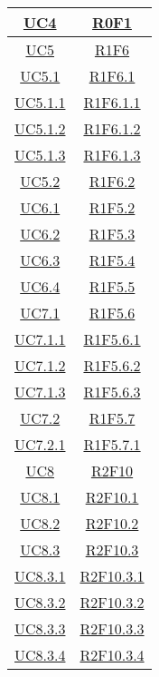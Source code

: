 \begin{longtable}{|c|c|}
	\hyperlink{UC4}{UC4} & \hyperlink{R0F1}{R0F1}\\
	\hline
	\hyperlink{UC5}{UC5} & \hyperlink{R1F6}{R1F6}\\
	\hline
	\hyperlink{UC5.1}{UC5.1} & \hyperlink{R1F6.1}{R1F6.1}\\
	\hline
	\hyperlink{UC5.1.1}{UC5.1.1} & \hyperlink{R1F6.1.1}{R1F6.1.1}\\
	\hline
	\hyperlink{UC5.1.2}{UC5.1.2} & \hyperlink{R1F6.1.2}{R1F6.1.2}\\
	\hline
	\hyperlink{UC5.1.3}{UC5.1.3} & \hyperlink{R1F6.1.3}{R1F6.1.3}\\
	\hline
	\hyperlink{UC5.2}{UC5.2} & \hyperlink{R1F6.2}{R1F6.2}\\
	\hline
	\hyperlink{UC6.1}{UC6.1} & \hyperlink{R1F5.2}{R1F5.2}\\
	\hline
	\hyperlink{UC6.2}{UC6.2} & \hyperlink{R1F5.3}{R1F5.3}\\
	\hline
	\hyperlink{UC6.3}{UC6.3} & \hyperlink{R1F5.4}{R1F5.4}\\
	\hline
	\hyperlink{UC6.4}{UC6.4} & \hyperlink{R1F5.5}{R1F5.5}\\
	\hline
	\hyperlink{UC7.1}{UC7.1} & \hyperlink{R1F5.6}{R1F5.6}\\
	\hline
	\hyperlink{UC7.1.1}{UC7.1.1} & \hyperlink{R1F5.6.1}{R1F5.6.1}\\
	\hline
	\hyperlink{UC7.1.2}{UC7.1.2} & \hyperlink{R1F5.6.2}{R1F5.6.2}\\
	\hline
	\hyperlink{UC7.1.3}{UC7.1.3} & \hyperlink{R1F5.6.3}{R1F5.6.3}\\
	\hline
	\hyperlink{UC7.2}{UC7.2} & \hyperlink{R1F5.7}{R1F5.7}\\
	\hline
	\hyperlink{UC7.2.1}{UC7.2.1} & \hyperlink{R1F5.7.1}{R1F5.7.1}\\
	\hline
	\hyperlink{UC8}{UC8} & \hyperlink{R2F10}{R2F10}\\
	\hline
	\hyperlink{UC8.1}{UC8.1} & \hyperlink{R2F10.1}{R2F10.1}\\
	\hline
	\hyperlink{UC8.2}{UC8.2} & \hyperlink{R2F10.2}{R2F10.2}\\
	\hline
	\hyperlink{UC8.3}{UC8.3} & \hyperlink{R2F10.3}{R2F10.3}\\
	\hline
	\hyperlink{UC8.3.1}{UC8.3.1} & \hyperlink{R2F10.3.1}{R2F10.3.1}\\
	\hline
	\hyperlink{UC8.3.2}{UC8.3.2} & \hyperlink{R2F10.3.2}{R2F10.3.2}\\
	\hline
	\hyperlink{UC8.3.3}{UC8.3.3} & \hyperlink{R2F10.3.3}{R2F10.3.3}\\
	\hline
	\hyperlink{UC8.3.4}{UC8.3.4} & \hyperlink{R2F10.3.4}{R2F10.3.4}\\

\end{longtable}
